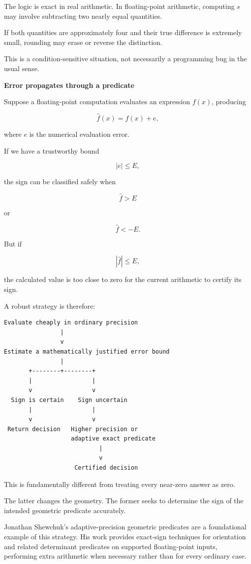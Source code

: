 The logic is exact in real arithmetic. In floating-point arithmetic, computing \(s\) may involve subtracting two nearly equal quantities.

If both quantities are approximately four and their true difference is extremely small, rounding may erase or reverse the distinction.

This is a condition-sensitive situation, not necessarily a programming bug in the usual sense.

\textbf{Error propagates through a predicate}

Suppose a floating-point computation evaluates an expression \(f(x)\), producing

\[
\widehat f(x)=f(x)+e,
\]

where \(e\) is the numerical evaluation error.

If we have a trustworthy bound

\[
|e|\le E,
\]

the sign can be classified safely when

\[
\widehat f>E
\]

or

\[
\widehat f<-E.
\]

But if

\[
|\widehat f|\le E,
\]

the calculated value is too close to zero for the current arithmetic to certify its sign.

A robust strategy is therefore:

\begin{verbatim}
Evaluate cheaply in ordinary precision
                |
                v
Estimate a mathematically justified error bound
                |
       +--------+--------+
       |                 |
       v                 v
  Sign is certain    Sign uncertain
       |                 |
       v                 v
 Return decision   Higher precision or
                   adaptive exact predicate
                           |
                           v
                    Certified decision
\end{verbatim}

This is fundamentally different from treating every near-zero answer as zero.

The latter changes the geometry. The former seeks to determine the sign of the intended geometric predicate accurately.

Jonathan Shewchuk's adaptive-precision geometric predicates are a foundational example of this strategy. His work provides exact-sign techniques for orientation and related determinant predicates on supported floating-point inputs, performing extra arithmetic when necessary rather than for every ordinary case. 

